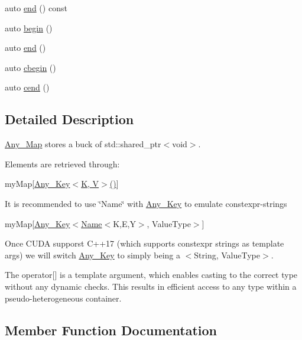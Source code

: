 \begin{DoxyCompactItemize}
\item 
auto \hyperlink{classbc_1_1utility_1_1Any__Map_ae0f081d0501c3d8edcd68174fdd49ba5}{end} () const
\item 
auto \hyperlink{classbc_1_1utility_1_1Any__Map_a10ee269a7bb8dc9ddf1476042a2b3eab}{begin} ()
\item 
auto \hyperlink{classbc_1_1utility_1_1Any__Map_ad4e665fb716c5fbaedd9e7146d79e991}{end} ()
\item 
auto \hyperlink{classbc_1_1utility_1_1Any__Map_a92726117ebfa4b927d17eb45215a3c01}{cbegin} ()
\item 
auto \hyperlink{classbc_1_1utility_1_1Any__Map_a34df567594568b3cf78190e4469e6491}{cend} ()
\end{DoxyCompactItemize}


\subsection{Detailed Description}
\hyperlink{classbc_1_1utility_1_1Any__Map}{Any\+\_\+\+Map} stores a buck of std\+::shared\+\_\+ptr$<$void$>$. 

Elements are retrieved through\+:

my\+Map\mbox{[}\hyperlink{structbc_1_1utility_1_1Any__Key}{Any\+\_\+\+Key$<$\+K, V$>$()}\mbox{]}

It is recommended to use \char`\"{}\+Name\char`\"{} with \hyperlink{structbc_1_1utility_1_1Any__Key}{Any\+\_\+\+Key} to emulate constexpr-\/strings

my\+Map\mbox{[}\hyperlink{structbc_1_1utility_1_1Any__Key}{Any\+\_\+\+Key}$<$\hyperlink{structbc_1_1utility_1_1Name}{Name}$<$\textquotesingle{}K\textquotesingle{},\textquotesingle{}E\textquotesingle{},\textquotesingle{}Y\textquotesingle{}$>$, Value\+Type$>$\mbox{]}

Once C\+U\+DA supporst C++17 (which supports constexpr strings as template args) we will switch \hyperlink{structbc_1_1utility_1_1Any__Key}{Any\+\_\+\+Key} to simply being a $<$String, Value\+Type$>$.

The operator\mbox{[}\mbox{]} is a template argument, which enables casting to the correct type without any dynamic checks. This results in efficient access to \textquotesingle{}any\textquotesingle{} type within a pseudo-\/heterogeneous container. 

\subsection{Member Function Documentation}
\mbox{\label{classbc_1_1utility_1_1Any__Map_aedde6d40e8c81b80d9f4f16a55c0fab2}} 
